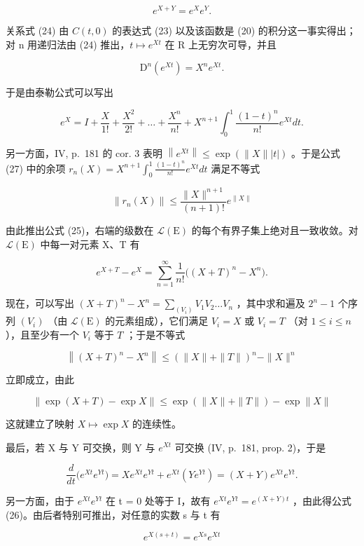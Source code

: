 \[
e ^ {X + Y} = e ^ {X} e ^ {Y}.\tag{26}
\]

关系式 (24) 由 \(C(t,0)\) 的表达式 (23) 以及该函数是 (20) 的积分这一事实得出；对 n 用递归法由 (24) 推出，\(t \mapsto e^{Xt}\) 在 R 上无穷次可导，并且

\[
\mathrm{D} ^ {n} \left(e ^ {X t}\right) = X ^ {n} e ^ {X t}.
\]

于是由泰勒公式可以写出

\[
e ^ {X} = I + \frac {X}{1 !} + \frac {X ^ {2}}{2 !} + \dots + \frac {X ^ {n}}{n !} + X ^ {n + 1} \int_ {0} ^ {1} \frac {(1 - t) ^ {n}}{n !} e ^ {X t} d t.\tag{27}
\]

另一方面，IV, p.~181 的 cor. 3 表明 \(\left\| e^{Xt}\right\| \leqslant \exp \left(\| X\| |t|\right)\) 。于是公式 (27) 中的余项 \(r_n(X) = X^{n + 1}\int_0^1\frac{(1 - t)^n}{n!} e^{Xt}dt\) 满足不等式

\[
\| r _ {n} (X) \| \leqslant \frac {\| X \| ^ {n + 1}}{(n + 1) !} e ^ {\| X \|}
\]

由此推出公式 (25)，右端的级数在 \(\mathcal{L}(\mathrm{E})\) 的每个有界子集上绝对且一致收敛。对 \(\mathcal{L}(\mathrm{E})\) 中每一对元素 X、T 有

\[
e ^ {X + T} - e ^ {X} = \sum_ {n = 1} ^ {\infty} \frac {1}{n !} \big ((X + T) ^ {n} - X ^ {n} \big).
\]

现在，可以写出 \((X + T)^n - X^n = \sum_{(V_i)} V_1 V_2 \ldots V_n\) ，其中求和遍及 \(2^n - 1\) 个序列 \((V_i)\) （由 \(\mathcal{L}(\mathrm{E})\) 的元素组成），它们满足 \(V_i = X\) 或 \(V_i = T\) （对 \(1 \leqslant i \leqslant n\) ），且至少有一个 \(V_i\) 等于 \(T\) ；于是不等式

\[
\left\| (X + T) ^ {n} - X ^ {n} \right\| \leqslant \left(\| X \| + \| T \|\right) ^ {n} - \| X \| ^ {n}
\]

立即成立，由此

\[
\| \exp (X + T) - \exp X \| \leqslant \exp \left(\| X \| + \| T \|\right) - \exp \| X \|\tag{28}
\]

这就建立了映射 \(X \mapsto \exp X\) 的连续性。

最后，若 X 与 Y 可交换，则 Y 与 \(e^{Xt}\) 可交换 (IV, p.~181, prop. 2)，于是

\[
\frac {d}{d t} \big (e ^ {X t} e ^ {Y t} \big) = X e ^ {X t} e ^ {Y t} + e ^ {X t} (Y e ^ {Y t}) = (X + Y) e ^ {X t} e ^ {Y t}.
\]

另一方面，由于 \(e^{Xt}e^{Yt}\) 在 t = 0 处等于 I，故有 \(e^{Xt}e^{Yt} = e^{(X+Y)t}\) ，由此得公式 (26)。由后者特别可推出，对任意的实数 s 与 t 有

\[
e ^ {X (s + t)} = e ^ {X s} e ^ {X t}\tag{29}
\]

